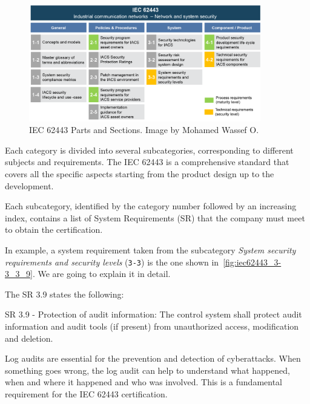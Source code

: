 \begin{figure}[t]
  \centering
  \includegraphics[width=0.9\textwidth]{chapters/04/assets/iec62443.png}
  \caption[IEC 62443 Parts and Sections. Image by Mohamed Wassef O. \protect\footnotemark]{IEC 62443 Parts and Sections. Image by Mohamed Wassef O. \protect\footnotemark}
  \label{fig:iec-62443}
\end{figure}

Each category is divided into several subcategories, corresponding to different subjects and requirements. The IEC 62443 is a comprehensive standard that covers all the specific aspects starting from the product design up to the development.

Each subcategory, identified by the category number followed by an increasing index, contains a list of System Requirements (SR) that the company must meet to obtain the certification.

In example, a system requirement taken from the subcategory \textit{System security requirements and security levels} (\texttt{3-3}) is the one shown in~\cref{fig:iec62443_3-3_3_9}. We are going to explain it in detail.

The SR 3.9 states the following:
\begin{mdframed}
  SR 3.9 - Protection of audit information: The control system shall protect audit information and audit tools (if present) from unauthorized access, modification and deletion.
\end{mdframed}\label{sr:3-3_3-9}

Log audits are essential for the prevention and detection of cyberattacks. When something goes wrong, the log audit can help to understand what happened, when and where it happened and who was involved. This is a fundamental requirement for the IEC 62443 certification.


